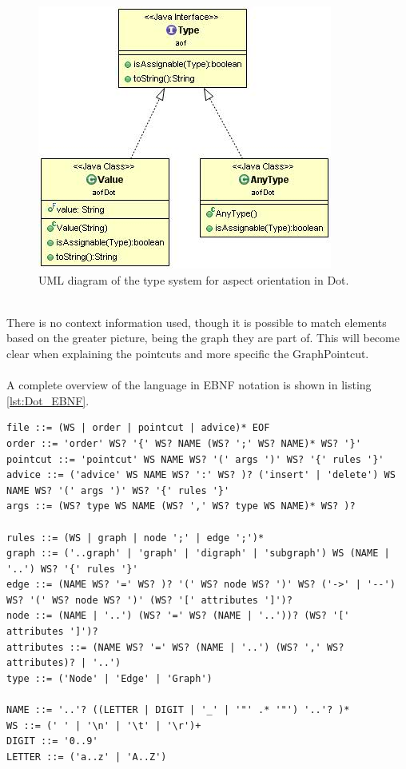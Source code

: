 \documentclass[a4paper]{report}
\begin{document}
\begin{figure}[h]
\centering
\includegraphics[scale=0.7]{images/AOFDot/DotType.jpg}
\caption{UML diagram of the type system for aspect orientation in Dot.}
\label{fig:DotType}
\end{figure}\\
There is no context information used, though it is possible to match elements based on the greater picture, being the graph they are part of. This will become clear when explaining the pointcuts and more specific the GraphPointcut.\\
\\
A complete overview of the language in EBNF notation is shown in listing \ref{lst:Dot_EBNF}.
\begin{lstlisting}[caption=EBNF notation of the aspect language., label=lst:Dot_EBNF]
file ::= (WS | order | pointcut | advice)* EOF
order ::= 'order' WS? '{' WS? NAME (WS? ';' WS? NAME)* WS? '}'
pointcut ::= 'pointcut' WS NAME WS? '(' args ')' WS? '{' rules '}' 
advice ::= ('advice' WS NAME WS? ':' WS? )? ('insert' | 'delete') WS NAME WS? '(' args ')' WS? '{' rules '}'
args ::= (WS? type WS NAME (WS? ',' WS? type WS NAME)* WS? )?

rules ::= (WS | graph | node ';' | edge ';')*
graph ::= ('..graph' | 'graph' | 'digraph' | 'subgraph') WS (NAME | '..') WS? '{' rules '}'
edge ::= (NAME WS? '=' WS? )? '(' WS? node WS? ')' WS? ('->' | '--') WS? '(' WS? node WS? ')' (WS? '[' attributes ']')?
node ::= (NAME | '..') (WS? '=' WS? (NAME | '..'))? (WS? '[' attributes ']')?
attributes ::= (NAME WS? '=' WS? (NAME | '..') (WS? ',' WS? attributes)? | '..')
type ::= ('Node' | 'Edge' | 'Graph')

NAME ::= '..'? ((LETTER | DIGIT | '_' | '"' .* '"') '..'? )* 
WS ::= (' ' | '\n' | '\t' | '\r')+
DIGIT ::= '0..9'
LETTER ::= ('a..z' | 'A..Z')
\end{lstlisting}
\end{document}
